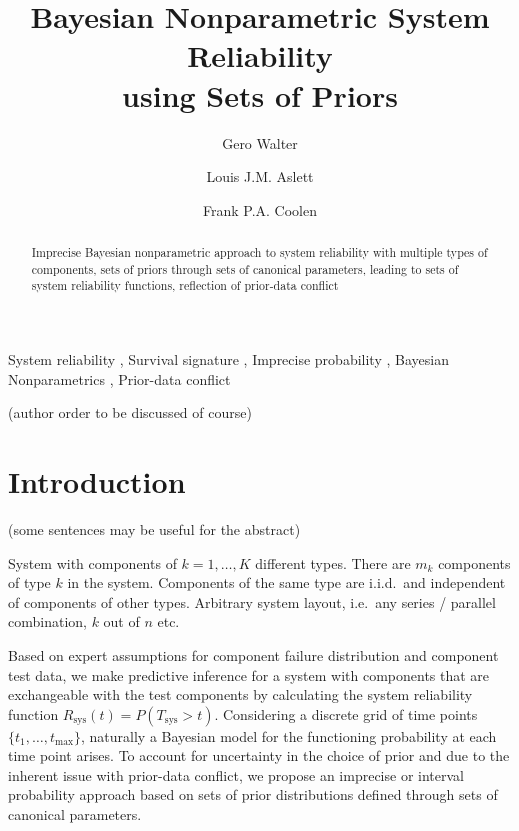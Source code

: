 \documentclass[authoryear, 12pt, a4paper]{elsarticle}
\newcommand{\Rsys}{R_\text{sys}}
\def\Tsys{T_\text{sys}}
\def\tmax{t_\text{max}}
\begin{document}

\begin{frontmatter}
\title{Bayesian Nonparametric System Reliability\\ using Sets of Priors}

\author[ein]{Gero Walter}
\author[oxf]{Louis J.M. Aslett}
\author[dur]{Frank P.A. Coolen}

\address[ein]{School of Industrial Engineering, Eindhoven University of Technology, Eindhoven, NL}
\address[oxf]{Department of Statistics, University of Oxford, Oxford, UK}
\address[dur]{Department of Mathematical Sciences, Durham University, Durham, UK}


\begin{abstract}
Imprecise Bayesian nonparametric approach to system reliability with multiple types of components,
sets of priors through sets of canonical parameters,
leading to sets of system reliability functions,
reflection of prior-data conflict
\end{abstract}

\begin{keyword}
System reliability \sep
Survival signature \sep
Imprecise probability \sep
Bayesian Nonparametrics \sep
Prior-data conflict
\end{keyword}
\end{frontmatter}



(author order to be discussed of course)

\section{Introduction}

(some sentences may be useful for the abstract)

System with components of $k=1,\ldots,K$ different types.
There are $m_k$ components of type $k$ in the system.
Components of the same type are i.i.d.\ and independent of components of other types.
Arbitrary system layout, i.e.\ any series / parallel combination, $k$ out of $n$ etc.

Based on expert assumptions for component failure distribution and component test data,
we make predictive inference for a system with components that are exchangeable
with the test components by calculating the system reliability function $\Rsys(t) = P(\Tsys > t)$.
Considering a discrete grid of time points $\{t_1, \ldots, \tmax\}$,
naturally a Bayesian model for the functioning probability at each time point arises.
To account for uncertainty in the choice of prior and due to the inherent issue with prior-data conflict,
we propose an imprecise or interval probability approach
based on sets of prior distributions defined through sets of canonical parameters.
\end{document}
